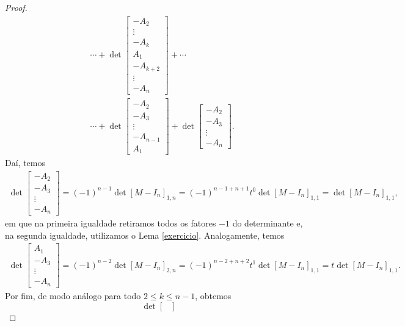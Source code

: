 \begin{proof}
\begin{align*}
    		&\cdots + \det\begin{bmatrix}
    		-A_2 \\
    		\vdots\\
    		-A_k \\
    		A_1\\
    		-A_{k+2}\\
    		\vdots\\
    		-A_n
    		\end{bmatrix} + \cdots \\
    		&\cdots + \det\begin{bmatrix}
    		-A_2\\
    		-A_3 \\
    		\vdots\\
    		-A_{n-1}\\
    		A_1
    		\end{bmatrix}+\det\begin{bmatrix}
    		-A_2\\
    		-A_3\\
    		\vdots\\
    		-A_n
    		\end{bmatrix}.
		\end{align*}
		Daí, temos
		\begin{align*}
    		\det\begin{bmatrix}
    		-A_2\\
    		-A_3\\
    		\vdots \\
    		-A_n
    		\end{bmatrix} 
    		= (-1)^{n-1}\det[M-I_n]_{1,n} 
    		= (-1)^{n-1+n+1}t^0\det[M - I_n]_{1,1} 
    		= \det[M-I_n]_{1,1},
		\end{align*}
		em que na primeira igualdade retiramos todos os fatores $-1$ do determinante e, na segunda igualdade,
		utilizamos o Lema \ref{exercicio}. Analogamente, temos
		\begin{align*}
    		\det\begin{bmatrix}
    		A_1\\
    		-A_3\\
    		\vdots\\
    		-A_n
    		\end{bmatrix} = (-1)^{n-2}\det[M-I_n]_{2,n} 
    		= (-1)^{n-2+n+2}t^1\det[M - I_n]_{1,1} 
    		= t\det[M - I_n]_{1,1}.
		\end{align*}
		Por fim, de modo análogo para todo $2\leq k\leq n-1$, obtemos
		\begin{equation*}
    		\det\begin{bmatrix}

\end{bmatrix}
\end{equation*}
\end{proof}
